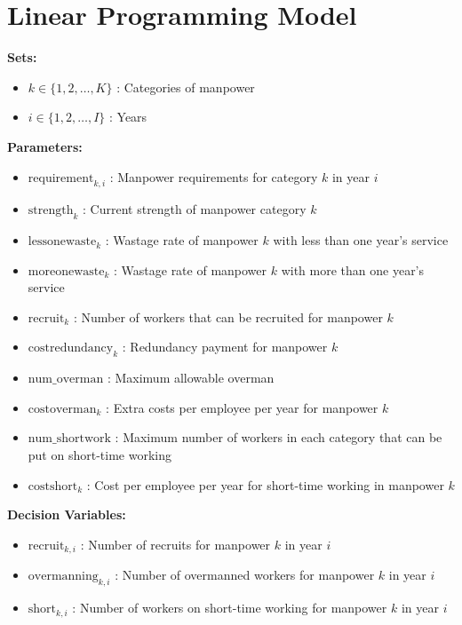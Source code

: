 \documentclass{article}
\begin{document}
\section*{Linear Programming Model}

\textbf{Sets:}
\begin{itemize}
    \item \( k \in \{1, 2, \ldots, K\} \) : Categories of manpower
    \item \( i \in \{1, 2, \ldots, I\} \) : Years
\end{itemize}

\textbf{Parameters:}
\begin{itemize}
    \item \( \text{requirement}_{k, i} \) : Manpower requirements for category \( k \) in year \( i \)
    \item \( \text{strength}_{k} \) : Current strength of manpower category \( k \)
    \item \( \text{lessonewaste}_{k} \) : Wastage rate of manpower \( k \) with less than one year's service
    \item \( \text{moreonewaste}_{k} \) : Wastage rate of manpower \( k \) with more than one year's service
    \item \( \text{recruit}_{k} \) : Number of workers that can be recruited for manpower \( k \)
    \item \( \text{costredundancy}_{k} \) : Redundancy payment for manpower \( k \)
    \item \( \text{num\_overman} \) : Maximum allowable overman
    \item \( \text{costoverman}_{k} \) : Extra costs per employee per year for manpower \( k \)
    \item \( \text{num\_shortwork} \) : Maximum number of workers in each category that can be put on short-time working
    \item \( \text{costshort}_{k} \) : Cost per employee per year for short-time working in manpower \( k \)
\end{itemize}

\textbf{Decision Variables:}
\begin{itemize}
    \item \( \text{recruit}_{k, i} \) : Number of recruits for manpower \( k \) in year \( i \)
    \item \( \text{overmanning}_{k, i} \) : Number of overmanned workers for manpower \( k \) in year \( i \)
    \item \( \text{short}_{k, i} \) : Number of workers on short-time working for manpower \( k \) in year \( i \)
\end{itemize}
\end{document}

